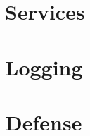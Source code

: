 \documentclass[letterpaper,twocolumn,10pt]{article}
\begin{document}

\section{Services}


\section{Logging}


\section{Defense}





\end{document}
